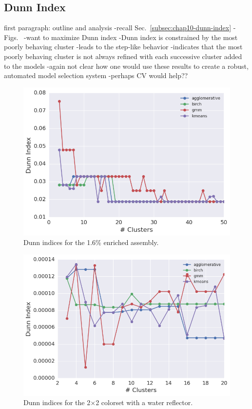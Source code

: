 \subsection{Dunn Index}
\label{subsec:chap11-dunn-index}

first paragraph: outline and analysis
-recall Sec.~\ref{subsec:chap10-dunn-index}
-Figs.~
-want to maximize Dunn index
-Dunn index is constrained by the most poorly behaving cluster
  -leads to the step-like behavior
    -indicates that the most poorly behaving cluster is not always refined with each successive cluster added to the models
-again not clear how one would use these results to create a robust, automated model selection system
  -perhaps CV would help??

\begin{figure}[h!]
\centering
\includegraphics[width=0.87\linewidth]{figures/results/model-select/assm-16/dunn-combined-U238-capture-1}
\vspace{2mm}
\caption[Dunn indices for the 1.6\% enriched assembly]{Dunn indices for the 1.6\% enriched assembly.}
\label{fig:chap11-assm-16-dunn-index}
\end{figure}

\begin{figure}[h!]
\centering
\includegraphics[width=0.87\linewidth]{figures/results/model-select/reflector/dunn-combined-U238-nu-fission-1}
\vspace{2mm}
\caption[Dunn indices for the 2$\times$2 colorset with reflector]{Dunn indices for the 2$\times$2 colorset with a water reflector.}
\label{fig:chap11-refl-dunn-index}
\end{figure}

